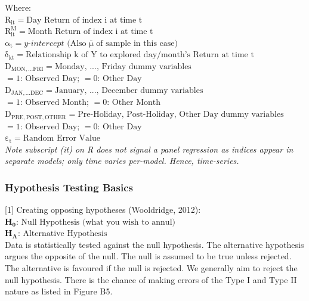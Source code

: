 \documentclass[11pt, english]{article}
\begin{document}
		Where:\\

		$\mathrm{R_{it}=\textrm{Day Return of index i at time t}}$\\
		$\mathrm{R_{it}^M=\textrm{Month Return of index i at time t}}$\\
		$\mathrm{\alpha_t=\textit{y-intercept}\textrm{ (Also }\bar{\mu}\textrm{ of sample in this case)}}$\\
		$\mathrm{\delta_{kt}=\textrm{Relationship k of Y to explored day/month's Return at time t}}$\\
		$\mathrm{D_{MON,...FRI}=\textrm{Monday, ..., Friday dummy variables}}$\\
		$\mathrm{=1\textrm{: Observed Day; }=0\textrm{: Other Day }}$\\
		$\mathrm{D_{JAN,...DEC}=\textrm{January, ..., December dummy variables}}$\\
		$\mathrm{=1\textrm{: Observed Month; }=0\textrm{: Other Month }}$\\
		$\mathrm{D_{PRE,POST,OTHER}=\textrm{Pre-Holiday, Post-Holiday, Other Day dummy variables}}$\\
		$\mathrm{=1\textrm{: Observed Day; }=0\textrm{: Other Day }}$\\
		$\mathrm{\varepsilon_t=\textrm{Random Error Value}}$\\

		\textit{Note subscript (it) on R does not signal a panel regression as indices appear in separate models; only time varies per-model. Hence, time-series.}\\

	\newpage 

		\subsubsection{Hypothesis Testing Basics}

		[1] Creating opposing hypotheses (Wooldridge, 2012):\\

		$\mathrm{\mathbf{H_0}\textbf{:}\textrm{ Null Hypothesis (what you wish to annul)}}$\\ $\mathrm{\mathbf{H_A}\textbf{:}\textrm{ Alternative Hypothesis}}$\\

		Data is statistically tested against the null hypothesis. The alternative hypothesis argues the opposite of the null. The null is assumed to be true unless rejected. The alternative is favoured if the null is rejected. We generally aim to reject the null hypothesis. There is the chance of making errors of the Type I and Type II nature as listed in Figure B5.\\
\end{document}
